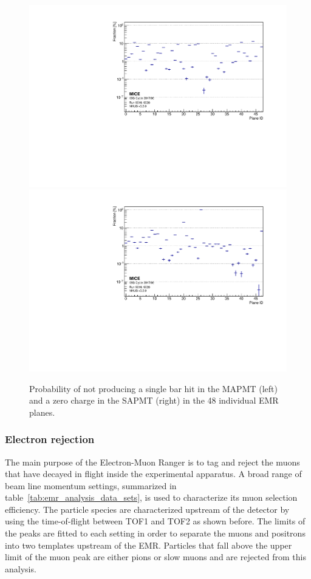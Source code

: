 \begin{figure}[htb!]
	\begin{center}
		\includegraphics[width=0.49\columnwidth]{missed_mapmt.pdf}
		\hfill
		\includegraphics[width=0.49\columnwidth]{missed_sapmt.pdf}
		\caption{Probability of not producing a single bar hit in the MAPMT (left) and a zero charge in the SAPMT (right) in the 48 individual EMR planes.}
		\label{fig:emr_plane_eff}
	\end{center}
\end{figure}

\subsubsection{Electron rejection}
The main purpose of the Electron-Muon Ranger is to tag and reject the muons that have decayed in flight inside the experimental apparatus. A broad range of beam line momentum settings, summarized in table~\ref{tab:emr_analysis_data_sets}, is used to characterize its muon selection efficiency. The particle species are characterized upstream of the detector by using the time-of-flight between TOF1 and TOF2 as shown before.
The limits of the peaks are fitted to each setting in order to separate the muons and positrons into two templates upstream of the EMR. Particles that fall above the upper limit of the muon peak are either pions or slow muons and are rejected from this analysis.

